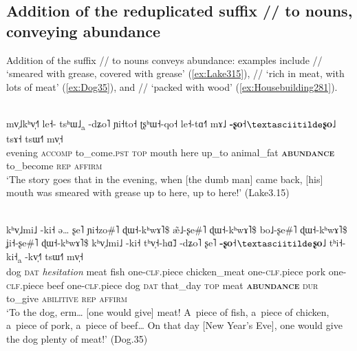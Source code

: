 \subsection[A reduplicated nominal suffix]{Addition of the reduplicated suffix // to nouns, conveying abundance}
\label{sec:additionofreduplicatedsuffix}

Addition of the suffix // to nouns conveys abundance: examples include
// ‘smeared with grease, covered with grease’ (\ref{ex:Lake315}), // ‘rich in meat, with lots of meat’ (\ref{ex:Dog35}), and // ‘packed with wood’ (\ref{ex:Housebuilding281}). 

\begin{exe}
	\ex
	\label{ex:Lake315}
	\\
	\gll mv̩˩kʰv̩˧˥		le˧-					tsʰɯ˩\textsubscript{a}		-dʑo˥		ɲi˧to˧		ʈʂʰɯ˧-qo˧		le˧-tɑ˧˥	mɤ˩		\textbf{-ʂo˧$\textasciitilde$ʂo˩}		tsɤ˧	tsɯ˧˥	mv̩˧\\
	evening		\textsc{accomp}			to\_come.\textsc{pst}	\textsc{top}	mouth	here	up\_to		animal\_fat		\textbf{\textsc{abundance}}	to\_become	\textsc{rep}		\textsc{affirm}\\
	\glt ‘The story goes that in the evening, when [the dumb man] came back, [his] mouth was smeared with grease up to here, up to here!’ (Lake3.15)
\end{exe}

\begin{exe}
	\ex
	\label{ex:Dog35}
	\\
	\gll kʰv̩˩mi˩	-ki˧		ə{\dots}					ʂe˥		ɲi˧zo\#˥		ɖɯ˧-kʰwɤ˥\$			æ̃˩-ʂe\#˥		ɖɯ˧-kʰwɤ˥\$		bo˩-ʂe\#˥		ɖɯ˧-kʰwɤ˥\$		ʝi˧-ʂe\#˥		ɖɯ˧-kʰwɤ˥\$		kʰv̩˩mi˩	-ki˧		tʰv̩˧-hɑ̃˩		-dʑo˥		ʂe˥		\textbf{-ʂo˧$\textasciitilde$ʂo˩}	tʰi˧-		ki˧\textsubscript{a}		-kv̩˧˥		tsɯ˧˥		mv̩˧\\
	dog		\textsc{dat}		\textit{hesitation}		meat	fish	one-\textsc{clf}.piece		chicken\_meat		one-\textsc{clf}.piece		pork		one-\textsc{clf}.piece	beef		one-\textsc{clf}.piece	dog		\textsc{dat}	that\_day	\textsc{top}	meat	\textbf{\textsc{abundance}}		\textsc{dur}	to\_give	\textsc{abilitive}	\textsc{rep}	\textsc{affirm}\\
	\glt ‘To the dog, erm{\dots} [one would give] meat! A~piece of fish, a~piece of chicken, a~piece of pork, a~piece of beef{\dots} On that day [New Year's Eve], one would give the dog plenty of meat!' (Dog.35)
\end{exe}

